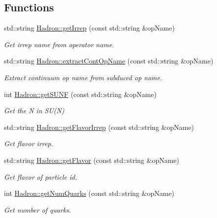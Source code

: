 \subsection*{Functions}
\begin{DoxyCompactItemize}
\item 
std\+::string \mbox{\hyperlink{namespaceHadron_a33d1d1e15a13f881d974049a8ae1c3dc}{Hadron\+::get\+Irrep}} (const std\+::string \&op\+Name)
\begin{DoxyCompactList}\small\item\em Get irrep name from operator name. \end{DoxyCompactList}\item 
std\+::string \mbox{\hyperlink{namespaceHadron_a0b8fc65d4da647ad0c70885da63e157e}{Hadron\+::extract\+Cont\+Op\+Name}} (const std\+::string \&op\+Name)
\begin{DoxyCompactList}\small\item\em Extract continuum op name from subduced op name. \end{DoxyCompactList}\item 
int \mbox{\hyperlink{namespaceHadron_a61e330de82814218612462c430ceaeb9}{Hadron\+::get\+S\+U\+NF}} (const std\+::string \&op\+Name)
\begin{DoxyCompactList}\small\item\em Get the N in S\+U(\+N) \end{DoxyCompactList}\item 
std\+::string \mbox{\hyperlink{namespaceHadron_ad5a318554ed24d3e28841abd57345adf}{Hadron\+::get\+Flavor\+Irrep}} (const std\+::string \&op\+Name)
\begin{DoxyCompactList}\small\item\em Get flavor irrep. \end{DoxyCompactList}\item 
std\+::string \mbox{\hyperlink{namespaceHadron_adfbec5b7f783df2c9cefec3692adf179}{Hadron\+::get\+Flavor}} (const std\+::string \&op\+Name)
\begin{DoxyCompactList}\small\item\em Get flavor of particle id. \end{DoxyCompactList}\item 
int \mbox{\hyperlink{namespaceHadron_a030f1f2fabdb2b0de5421b2a0a15689c}{Hadron\+::get\+Num\+Quarks}} (const std\+::string \&op\+Name)
\begin{DoxyCompactList}\small\item\em Get number of quarks. \end{DoxyCompactList}\item 

\end{DoxyCompactItemize}
